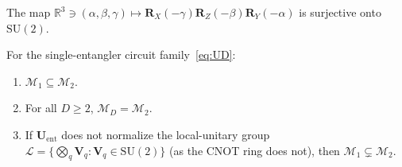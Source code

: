 \documentclass[10pt,a4paper]{amsart}
\newcommand{\SU}{\mathrm{SU}}
\newcommand{\bbR}{\mathbb{R}}
\newcommand{\cM}{\mathcal{M}}
\begin{document}
\begin{lemma}\label{lem:su2_cover}
  The map $\bbR^3\ni(\alpha,\beta,\gamma)\mapsto
  \mathbf{R}_X(-\gamma) \mathbf{R}_Z(-\beta) \mathbf{R}_Y(-\alpha)$ is surjective onto $\SU(2)$.
\end{lemma}

\begin{theorem}\label{thm:saturation}
  For the single-entangler circuit family~\eqref{eq:UD}:
  \begin{enumerate}[label=(\alph*)]
    \item $\cM_1\subseteq\cM_2$.
    \item For all $D\ge 2$, $\cM_D=\cM_2$.
    \item If $\mathbf{U}_{\mathrm{ent}}$ does not normalize the local-unitary
      group $\mathcal{L}=\{\bigotimes_q\mathbf{V}_q:\mathbf{V}_q\in\SU(2)\}$
      (as the CNOT ring does not), then $\cM_1\subsetneq\cM_2$.
  \end{enumerate}
\end{theorem}
\end{document}
